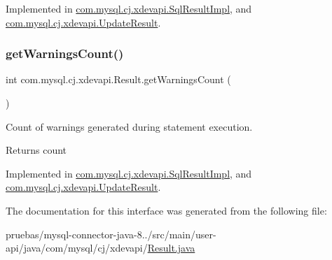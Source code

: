 Implemented in \mbox{\hyperlink{classcom_1_1mysql_1_1cj_1_1xdevapi_1_1_sql_result_impl_a58d7c6a9ad8d87b5447c2d2f5849ee73}{com.\+mysql.\+cj.\+xdevapi.\+Sql\+Result\+Impl}}, and \mbox{\hyperlink{classcom_1_1mysql_1_1cj_1_1xdevapi_1_1_update_result_a44b96bc6ac3193b0f276a8317d48b5b3}{com.\+mysql.\+cj.\+xdevapi.\+Update\+Result}}.

\mbox{\label{interfacecom_1_1mysql_1_1cj_1_1xdevapi_1_1_result_addd5c82af4ab35e702d7f2961119ecc6}} 
\subsubsection{\texorpdfstring{get\+Warnings\+Count()}{getWarningsCount()}}
{\footnotesize\ttfamily int com.\+mysql.\+cj.\+xdevapi.\+Result.\+get\+Warnings\+Count (\begin{DoxyParamCaption}{ }\end{DoxyParamCaption})}

Count of warnings generated during statement execution.

\begin{DoxyReturn}{Returns}
count 
\end{DoxyReturn}


Implemented in \mbox{\hyperlink{classcom_1_1mysql_1_1cj_1_1xdevapi_1_1_sql_result_impl_aec69633fd00fa0b998014ea8f94cc797}{com.\+mysql.\+cj.\+xdevapi.\+Sql\+Result\+Impl}}, and \mbox{\hyperlink{classcom_1_1mysql_1_1cj_1_1xdevapi_1_1_update_result_a5a4640f6081699843d69643728e1038b}{com.\+mysql.\+cj.\+xdevapi.\+Update\+Result}}.



The documentation for this interface was generated from the following file\+:\begin{DoxyCompactItemize}
\item 
pruebas/mysql-\/connector-\/java-\/8../src/main/user-\/api/java/com/mysql/cj/xdevapi/\mbox{\hyperlink{_result_8java}{Result.\+java}}\end{DoxyCompactItemize}
